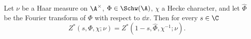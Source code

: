 Let $\nu$ be a Haar measure on $\A^\times$, $\Phi\in\Schw(\A)$, $\chi$ a Hecke character, and let $\hat\Phi$ be the
Fourier transform of $\Phi$ with respect to $\dd x$. Then for every $s\in\C$
\[
  Z^*(s,\Phi,\chi;\nu)=Z^*(1-s,\hat\Phi,\chi^{-1};\nu).
\]
